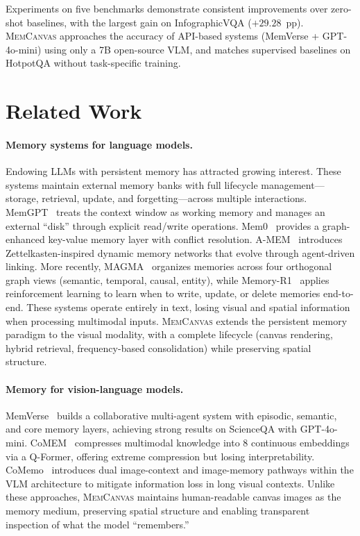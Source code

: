 \documentclass{article}
\newcommand{\memcanvas}{\textsc{MemCanvas}}
\begin{document}
Experiments on five benchmarks demonstrate consistent improvements over zero-shot baselines, with the largest gain on InfographicVQA ($+29.28$~pp). \memcanvas{} approaches the accuracy of API-based systems (MemVerse + GPT-4o-mini) using only a 7B open-source VLM, and matches supervised baselines on HotpotQA without task-specific training.

\section{Related Work}
\label{sec:related}

\paragraph{Memory systems for language models.}
Endowing LLMs with persistent memory has attracted growing interest. These systems maintain external memory banks with full lifecycle management---storage, retrieval, update, and forgetting---across multiple interactions. MemGPT~\citep{packer2023memgpt} treats the context window as working memory and manages an external ``disk'' through explicit read/write operations. Mem0~\citep{mem0_2025} provides a graph-enhanced key-value memory layer with conflict resolution. A-MEM~\citep{zhao2025amem} introduces Zettelkasten-inspired dynamic memory networks that evolve through agent-driven linking. More recently, MAGMA~\citep{jiang2026magma} organizes memories across four orthogonal graph views (semantic, temporal, causal, entity), while Memory-R1~\citep{yan2025memoryr1} applies reinforcement learning to learn when to write, update, or delete memories end-to-end. These systems operate entirely in text, losing visual and spatial information when processing multimodal inputs. \memcanvas{} extends the persistent memory paradigm to the visual modality, with a complete lifecycle (canvas rendering, hybrid retrieval, frequency-based consolidation) while preserving spatial structure.

\paragraph{Memory for vision-language models.}
MemVerse~\citep{lu2024memverse} builds a collaborative multi-agent system with episodic, semantic, and core memory layers, achieving strong results on ScienceQA with GPT-4o-mini. CoMEM~\citep{wu2025comem} compresses multimodal knowledge into 8 continuous embeddings via a Q-Former, offering extreme compression but losing interpretability. CoMemo~\citep{liu2025comemo} introduces dual image-context and image-memory pathways within the VLM architecture to mitigate information loss in long visual contexts. Unlike these approaches, \memcanvas{} maintains human-readable canvas images as the memory medium, preserving spatial structure and enabling transparent inspection of what the model ``remembers.''
\end{document}
